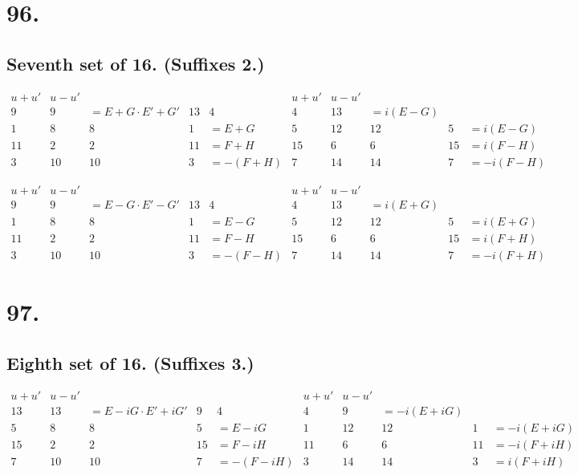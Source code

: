 \documentclass[11pt,a4paper]{article}
\begin{document}
\newpage
\section*{96.}
\label{sec:96}

\subsection*{Seventh set of 16. (Suffixes 2.)}

\[
\begin{array}{c|cccc|c|cccc}
u+u' & u-u' & & & & u+u' & u-u' & & & \\
\hline
9 & 9 & = E+G \cdot E'+G' & 13 & 4 & 4 & 13 & = i(E-G) \\
1 & 8 & 8 & 1 & = E+G & 5 & 12 & 12 & 5 & = i(E-G) \\
11 & 2 & 2 & 11 & = F+H & 15 & 6 & 6 & 15 & = i(F-H) \\
3 & 10 & 10 & 3 & = -(F+H) & 7 & 14 & 14 & 7 & = -i(F-H)
\end{array}
\]

\[
\begin{array}{c|cccc|c|cccc}
u+u' & u-u' & & & & u+u' & u-u' & & & \\
\hline
9 & 9 & = E-G \cdot E'-G' & 13 & 4 & 4 & 13 & = i(E+G) \\
1 & 8 & 8 & 1 & = E-G & 5 & 12 & 12 & 5 & = i(E+G) \\
11 & 2 & 2 & 11 & = F-H & 15 & 6 & 6 & 15 & = i(F+H) \\
3 & 10 & 10 & 3 & = -(F-H) & 7 & 14 & 14 & 7 & = -i(F+H)
\end{array}
\]

\newpage
\section*{97.}
\label{sec:97}

\subsection*{Eighth set of 16. (Suffixes 3.)}

\[
\begin{array}{c|cccc|c|cccc}
u+u' & u-u' & & & & u+u' & u-u' & & & \\
\hline
13 & 13 & = E-iG \cdot E'+iG' & 9 & 4 & 4 & 9 & = -i(E+iG) \\
5 & 8 & 8 & 5 & = E-iG & 1 & 12 & 12 & 1 & = -i(E+iG) \\
15 & 2 & 2 & 15 & = F-iH & 11 & 6 & 6 & 11 & = -i(F+iH) \\
7 & 10 & 10 & 7 & = -(F-iH) & 3 & 14 & 14 & 3 & = i(F+iH)
\end{array}
\]
\end{document}
